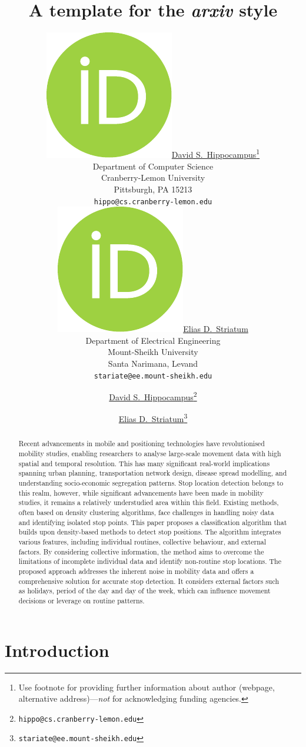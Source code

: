 \documentclass{article}
\title{A template for the \emph{arxiv} style}
\author{ \href{https://orcid.org/0000-0000-0000-0000}{\includegraphics[scale=0.06]{orcid.pdf}\hspace{1mm}David S.~Hippocampus}\thanks{Use footnote for providing further
		information about author (webpage, alternative
		address)---\emph{not} for acknowledging funding agencies.} \\
	Department of Computer Science\\
	Cranberry-Lemon University\\
	Pittsburgh, PA 15213 \\
	\texttt{hippo@cs.cranberry-lemon.edu} \\
	\And
	\href{https://orcid.org/0000-0000-0000-0000}{\includegraphics[scale=0.06]{orcid.pdf}\hspace{1mm}Elias D.~Striatum} \\
	Department of Electrical Engineering\\
	Mount-Sheikh University\\
	Santa Narimana, Levand \\
	\texttt{stariate@ee.mount-sheikh.edu} \\
}
\author[1]{%
	\href{https://orcid.org/0000-0000-0000-0000}{\usebox{\orcid}\hspace{1mm}David S.~Hippocampus\thanks{\texttt{hippo@cs.cranberry-lemon.edu}}}%
}
\author[1,2]{%
	\href{https://orcid.org/0000-0000-0000-0000}{\usebox{\orcid}\hspace{1mm}Elias D.~Striatum\thanks{\texttt{stariate@ee.mount-sheikh.edu}}}%
}
\affil[1]{Department of Computer Science, Cranberry-Lemon University, Pittsburgh, PA 15213}
\affil[2]{Department of Electrical Engineering, Mount-Sheikh University, Santa Narimana, Levand}
\begin{document}
\maketitle

\begin{abstract}
    Recent advancements in mobile and positioning technologies have revolutionised mobility studies, enabling researchers to analyse large-scale movement data with high spatial and temporal resolution. This has many significant real-world implications spanning urban planning, transportation network design, disease spread modelling, and understanding socio-economic segregation patterns.
    Stop location detection belongs to this realm, however, while significant advancements have been made in mobility studies, it remains a relatively understudied area within this field. Existing methods, often based on density clustering algorithms, face challenges in handling noisy data and identifying isolated stop points.
    This paper proposes a classification algorithm that builds upon density-based methods to detect stop positions. The algorithm integrates various features, including individual routines, collective behaviour, and external factors. By considering collective information, the method aims to overcome the limitations of incomplete individual data and identify non-routine stop locations.
    The proposed approach addresses the inherent noise in mobility data and offers a comprehensive solution for accurate stop detection. It considers external factors such as holidays, period of the day and day of the week, which can influence movement decisions or leverage on routine patterns. 
\end{abstract}




\section{Introduction}
\end{document}
